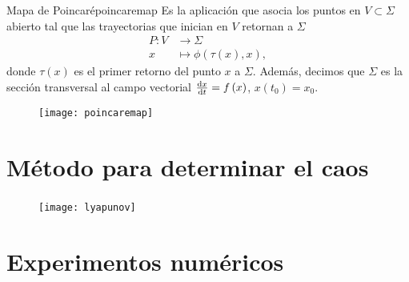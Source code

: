 \begin{frame}
	\frametitle{\subsecname}

	\begin{minipage}{0.6\textwidth}
		\begin{definition}{Mapa de Poincaré}{poincaremap}
			Es la aplicación que asocia los puntos en $V\subset\Sigma$ abierto
			tal que las trayectorias que inician en $V$ retornan a $\Sigma$
			\begin{align*}
				P\colon V & \to\Sigma                                      \\
				x         & \mapsto\phi\left(\tau\left(x\right), x\right),
			\end{align*}
			donde $\tau\left(x\right)$ es el primer retorno del punto $x$ a $\Sigma$.
			Además, decimos que $\Sigma$ es la sección transversal al campo vectorial
			$\diff{x}{t}=f\left(x\right)$, $x\left(t_{0}\right)=x_{0}$.
		\end{definition}
	\end{minipage}
	\begin{minipage}{0.3\textwidth}
		\begin{figure}[ht!]
			\centering
			\texttt{[image: poincaremap]}
		\end{figure}
	\end{minipage}

\end{frame}


\section{Método para determinar el caos}

\begin{frame}
	\frametitle{\secname}

	\begin{figure}[ht!]
		\centering
		\texttt{[image: lyapunov]}
	\end{figure}
\end{frame}

\section{Experimentos numéricos}

